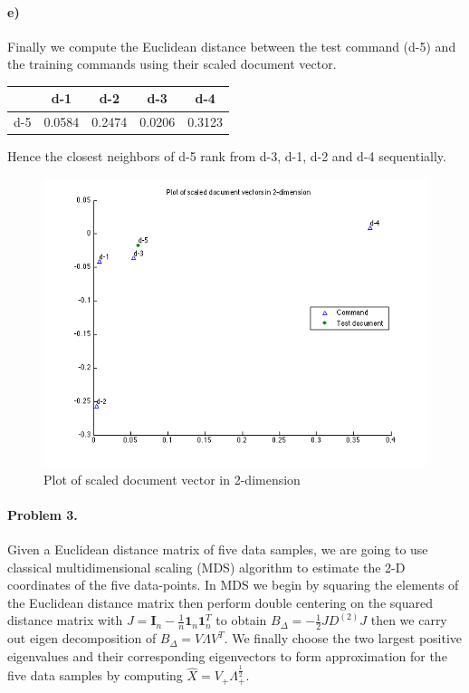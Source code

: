 \documentclass[a4paper]{article}
\begin{document}
\paragraph{e)} Finally we compute the Euclidean distance between the test command (d-5) and the training commands using their scaled document vector.

\begin{center}
    \begin{tabular}{ |c |c |c |c |c | }
      \hline
       & d-1 & d-2 & d-3 & d-4 \\ \hline
      d-5 &     0.0584  &  0.2474  &  0.0206 &   0.3123 \\ \hline
    \end{tabular}
\end{center}

Hence the closest neighbors of d-5 rank from d-3, d-1, d-2 and d-4 sequentially.

  \begin{figure}[H]
    \centering
      \includegraphics[scale=.57]{images/doc_vecs.png}
    \caption{Plot of scaled document vector in 2-dimension}
  \end{figure}

\paragraph{Problem 3.} Given a Euclidean distance matrix of five data samples, we are going to use classical multidimensional scaling (MDS) algorithm to estimate the 2-D coordinates of the five data-points. In MDS we begin by squaring the elements of the Euclidean distance matrix then perform double centering on the squared distance matrix with $J = \mathbf{I}_n - \frac{1}{n}\mathbf{1}_n\mathbf{1}_n^T$ to obtain $B_\Delta = -\frac{1}{2}JD^{(2)}J$ then we carry out eigen decomposition of $B_\Delta = V\Lambda V^T$. We finally choose the two largest positive eigenvalues and their corresponding eigenvectors to form approximation for the five data samples by computing $\hat{X} = V_{+}\Lambda_{+}^{\frac{1}{2}}$.
\end{document}
